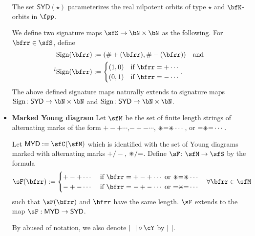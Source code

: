 \documentclass[12pt,a4paper]{amsart}
\def\abs#1{\left|{#1}\right|}
\def\SYD{{\mathsf{SYD}}}
\def\MYD{{\mathsf{MYD}}}
\numberwithin{equation}{section}
\theoremstyle{remark}
\def\lsign{{}^l\mathrm{Sign}}
\def\ssign{\mathrm{Sign}}
\def\umm{{=}}
\def\upp{{\ast}}
\def\upp{
  {{\setbox0\hbox{$\times$}
      \rlap{\hbox to \wd0{\hss$+$\hss}}\box0
    }}
}
\begin{document}
\begin{itemize}
        The set $\SYD(\star)$ parameterizes the real nilpotent orbits of type
        $\star$ and $\bfK$-orbits in $\fpp$.

        We define two signature maps $\sfS\rightarrow \bN\times \bN$ as the
        following. For $\bfrr\in \sfS$, define
        \[
        \begin{split}
          \ssign(\bfrr)& := (\#+(\bfrr), \#-(\bfrr)) \quad \text{and}\\
          \lsign(\bfrr)& := \begin{cases}
            (1,0) & \text{if } \bfrr = +\cdots\\
            (0,1) & \text{if } \bfrr = -\cdots\\
          \end{cases}.
        \end{split}
        \]
        The above defined signature maps naturally extends to signature maps
        $\ssign\colon \SYD\rightarrow \bN\times \bN$ and
        $\ssign\colon \SYD\rightarrow \bN\times \bN$.



  \item {\bf Marked Young diagram} Let $\sfM$ be the set of finite length
        strings of alternating marks of the form $+-+\cdots$,$-+-\cdots$,
        $\upp\umm\upp\cdots$, or $\umm\upp\umm\cdots$.

        Let $\MYD:=\sfC(\sfM)$ which is identified with the set of Young
        diagrams marked with alternating marks $+/-$, $\upp/\umm$. Define
        $\sF\colon \sfM \rightarrow \sfS$ by the formula
        \[
        \sF(\bfrr) := \begin{cases}
          +-+\cdots & \text{ if } \bfrr = +-+\cdots \text{ or } \upp\umm\upp\cdots\\
          -+-\cdots & \text{ if } \bfrr = -+-\cdots \text{ or } \umm\upp\umm\cdots\\
        \end{cases} \quad \forall \bfrr\in \sfM
        \]
        such that $\sF(\bfrr)$ and $\bfrr$ have the same length. $\sF$ extends
        to the map $\sF: \MYD \rightarrow \SYD$.

        By abused of notation, we also denote $\abs{\ \ }\circ \cY$ by
        $\abs{\ \ }$.


\end{itemize}
\end{document}
